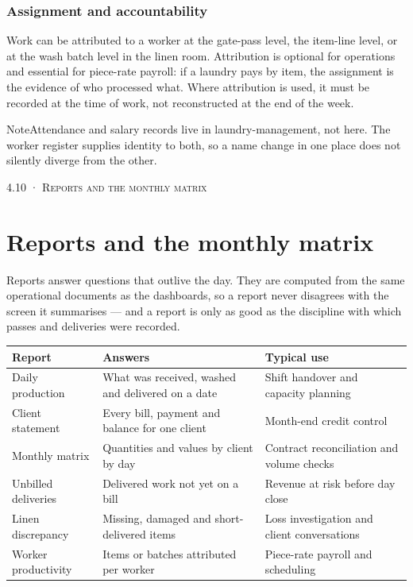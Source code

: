 \documentclass[11pt,a4paper,oneside]{book}
\begin{document}
\subsubsection*{Assignment and accountability}
Work can be attributed to a worker at the gate-pass level, the item-line level, or at the wash batch level in the linen room. Attribution is optional for operations and essential for piece-rate payroll: if a laundry pays by item, the assignment is the evidence of who processed what. Where attribution is used, it must be recorded at the time of work, not reconstructed at the end of the week.

\begin{notebox}NoteAttendance and salary records live in laundry-management, not here. The worker register supplies identity to both, so a name change in one place does not silently diverge from the other.\end{notebox}
\textsc{\small\color{crimson}4.10 · Reports and the monthly matrix}\par\medskip
\section*{Reports and the monthly matrix}
Reports answer questions that outlive the day. They are computed from the same operational documents as the dashboards, so a report never disagrees with the screen it summarises — and a report is only as good as the discipline with which passes and deliveries were recorded.

\begin{center}\small
\begin{tabularx}{\linewidth}{|X|X|X|}
\hline
\rowcolor{lightgrey}
\textbf{Report} & \textbf{Answers} & \textbf{Typical use} \\ \hline
Daily production & What was received, washed and delivered on a date & Shift handover and capacity planning \\ \hline
Client statement & Every bill, payment and balance for one client & Month-end credit control \\ \hline
Monthly matrix & Quantities and values by client by day & Contract reconciliation and volume checks \\ \hline
Unbilled deliveries & Delivered work not yet on a bill & Revenue at risk before day close \\ \hline
Linen discrepancy & Missing, damaged and short-delivered items & Loss investigation and client conversations \\ \hline
Worker productivity & Items or batches attributed per worker & Piece-rate payroll and scheduling \\ \hline
\end{tabularx}
\end{center}
\end{document}
